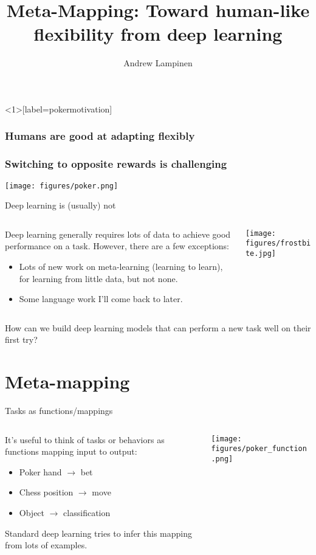 \documentclass{beamer}
\begin{document}
\title{Meta-Mapping: Toward human-like flexibility from deep learning}
\author{Andrew Lampinen}
\date{}
\frame{\titlepage}

\begin{frame}<1>[label=pokermotivation]
\frametitle<1>{Humans are good at adapting flexibly}
\frametitle<2>{Switching to opposite rewards is challenging}
\centering
\texttt{[image: figures/poker.png]}
\end{frame}

\begin{frame}{Deep learning is (usually) not}
\begin{columns}
\begin{column}{0.5\textwidth}
Deep learning generally requires lots of data to achieve good performance on a task. However, there are a few exceptions:
\begin{itemize}
    \item Lots of new work on meta-learning (learning to learn), for learning from little data, but not none.
    \item Some language work I'll come back to later.
\end{itemize}
\end{column}

\begin{column}{0.5\textwidth}
\texttt{[image: figures/frostbite.jpg]}
\end{column}
\end{columns}
\end{frame}

\begin{frame}[standout]
How can we build deep learning models that can perform a new task well on their first try?
\end{frame}

\section{Meta-mapping}

\begin{frame}{Tasks as functions/mappings}
\begin{columns}
\begin{column}{0.5\textwidth}
It's useful to think of tasks or behaviors as functions mapping input to output:
\begin{itemize}
    \item Poker hand \(\rightarrow\) bet
    \item Chess position \(\rightarrow\) move
    \item Object \(\rightarrow\) classification
\end{itemize}
Standard deep learning tries to infer this mapping from lots of examples. 
\end{column}

\begin{column}{0.5\textwidth}
\texttt{[image: figures/poker\_function.png]}
\end{column}
\end{columns}
\end{frame}
\end{document}
